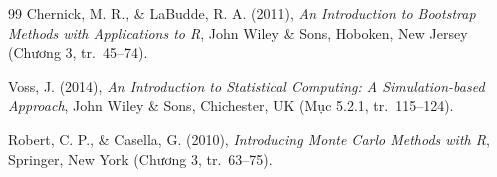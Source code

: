 \documentclass[12pt,a4paper]{article}
\theoremstyle{definition}
\numberwithin{equation}{section}
\begin{document}
\begin{thebibliography}{99}
		Chernick, M. R., \& LaBudde, R. A. (2011), \textit{An Introduction to Bootstrap Methods with Applications to R}, John Wiley \& Sons, Hoboken, New Jersey (Chương 3, tr.~45--74).

		Voss, J. (2014), \textit{An Introduction to Statistical Computing: A Simulation-based Approach}, John Wiley \& Sons, Chichester, UK (Mục 5.2.1, tr.~115--124).

		Robert, C. P., \& Casella, G. (2010), \textit{Introducing Monte Carlo Methods with R}, Springer, New York (Chương 3, tr.~63--75).

	\end{thebibliography}
\end{document}
